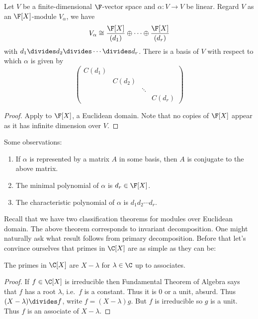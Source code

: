 \documentclass[a4paper]{article}
\theoremstyle{definition}
\begin{document}
\begin{theorem}
  Let \(V\) be a finite-dimensional \(\F\)-vector space and \(\alpha: V \to V\) be linear. Regard \(V\) as an \(\F[X]\)-module \(V_\alpha\), we have
  \[
    V_\alpha \cong \frac{\F[X]}{(d_1)} \oplus \dots \oplus \frac{\F[X]}{(d_r)}
  \]
  with \(d_1 \divides d_2 \divides \cdots \divides d_r\). There is a basis of \(V\) with respect to which \(\alpha\) is given by
  \[
    \begin{pmatrix}
      C(d_1) \\
      & C(d_2) \\
      & & \ddots \\
      & & & C(d_r)
    \end{pmatrix}
  \]
\end{theorem}

\begin{proof}
  Apply  to \(\F[X]\), a Euclidean domain. Note that no copies of \(\F[X]\) appear as it has infinite dimension over \(V\).
\end{proof}

Some observations:
\begin{enumerate}
\item If \(\alpha\) is represented by a matrix \(A\) in some basis, then \(A\) is conjugate to the above matrix.
\item The minimal polynomial of \(\alpha\) is \(d_r \in \F[X]\).
\item The characteristic polynomial of \(\alpha\) is \(d_1d_2\cdots d_r\).
\end{enumerate}

Recall that we have two classification theorems for modules over Euclidean domain. The above theorem corresponds to invariant decomposition. One might naturally ask what result follows from primary decomposition. Before that let's convince ourselves that primes in \(\C[X]\) are as simple as they can be:

\begin{lemma}
  The primes in \(\C[X]\) are \(X - \lambda\) for \(\lambda \in \C\) up to associates.
\end{lemma}

\begin{proof}
  If \(f \in \C[X]\) is irreducible then Fundamental Theorem of Algebra says that \(f\) has a root \(\lambda\), i.e.\ \(f\) is a constant. Thus it is \(0\) or a unit, absurd. Thus \((X - \lambda) \divides f\), write \(f = (X - \lambda) g\). But \(f\) is irreducible so \(g\) is a unit. Thus \(f\) is an associate of \(X - \lambda\).
\end{proof}
\end{document}
